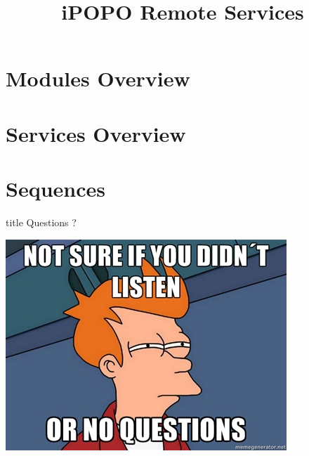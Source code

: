 \documentclass{beamer}
\title[Remote Services]{iPOPO Remote Services}
\begin{document}
\frame{\titlepage}

\section{Modules Overview}


\section{Services Overview}


\section{Sequences}


\begin{frame}
  \vfill
  \centering
  \begin{beamercolorbox}[sep=8pt,center,shadow=true,rounded=true]{title}
    Questions ?\par%
  \end{beamercolorbox}
  \vspace{3ex}
  \includegraphics[width=.5\textwidth]{../imgs/questions_fry}
  \vfill
\end{frame}
\end{document}
